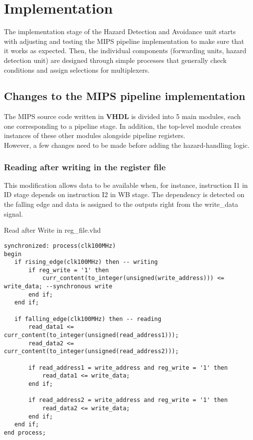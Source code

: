 \documentclass[a4paper,12pt]{report}
\begin{document}
\chapter{Implementation}
The implementation stage of the Hazard Detection and Avoidance unit starts with adjusting and testing the MIPS pipeline implementation to make sure that it works as expected. Then, the individual components (forwarding units, hazard detection unit) are designed through simple processes that generally check conditions and assign selections for multiplexers.

\section{Changes to the MIPS pipeline implementation}
The MIPS source code written in \textbf{VHDL} is divided into 5 main modules, each one corresponding to a pipeline stage. In addition, the top-level module creates instances of these other modules alongside pipeline registers. \\
However, a few changes need to be made before adding the hazard-handling logic.

\subsection{Reading after writing in the register file}
This modification allows data to be available when, for instance, instruction I1 in ID stage depends on instruction I2 in WB stage. The dependency is detected on the falling edge and data is assigned to the outputs right from the write\_data signal.

\begin{my-listing}{Read after Write in reg\_file.vhd}
    \begin{lstlisting}[style=vhdl]
synchronized: process(clk100MHz)
begin 
   if rising_edge(clk100MHz) then -- writing
       if reg_write = '1' then    
           curr_content(to_integer(unsigned(write_address))) <= write_data; --synchronous write
       end if;
   end if;
   
   if falling_edge(clk100MHz) then -- reading
       read_data1 <= curr_content(to_integer(unsigned(read_address1)));
       read_data2 <= curr_content(to_integer(unsigned(read_address2)));
       
       if read_address1 = write_address and reg_write = '1' then
           read_data1 <= write_data;
       end if;
       
       if read_address2 = write_address and reg_write = '1' then
           read_data2 <= write_data;
       end if;      
   end if;    
end process;
    \end{lstlisting}
\end{my-listing}
\end{document}
